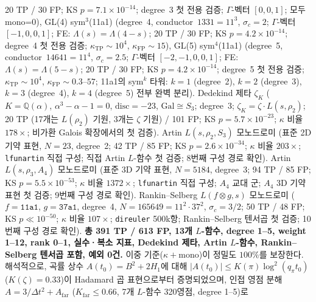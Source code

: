 \documentclass[11pt, a4paper]{article}
\theoremstyle{definition}
\theoremstyle{plain}
\begin{document}
\begin{itemize}
        20 TP / 30 FP; KS $p = 7.1 \times 10^{-14}$; degree~3 첫 전용 검증;
        $\Gamma$-벡터 $[0,0,1]$; 모두 mono=0),
        GL(4) sym$^3$(11a1) (degree~4, conductor~$1331=11^3$, $\sigma_c=2$;
        $\Gamma$-벡터 $[-1,0,0,1]$; FE: $\Lambda(s)=\Lambda(4-s)$;
        20 TP / 30 FP; KS $p = 4.2 \times 10^{-14}$; degree~4 첫 전용 검증;
        $\kappa_{\mathrm{TP}} \sim 10^4$, $\kappa_{\mathrm{FP}} \sim 15$),
        GL(5) sym$^4$(11a1) (degree~5, conductor~$14641=11^4$, $\sigma_c=2.5$;
        $\Gamma$-벡터 $[-2,-1,0,0,1]$; FE: $\Lambda(s)=\Lambda(5-s)$;
        20 TP / 30 FP; KS $p = 4.2 \times 10^{-14}$; degree~5 첫 전용 검증;
        $\kappa_{\mathrm{TP}} \sim 10^4$, $\kappa_{\mathrm{FP}} \sim 0.3$--$57$;
        11a1의 sym$^k$ 타워: $k=1$ (degree~2), $k=2$ (degree~3), $k=3$ (degree~4), $k=4$ (degree~5) 전부 완벽 분리).
        Dedekind 제타 $\zeta_K$ ($K = \mathbb{Q}(\alpha)$, $\alpha^3-\alpha-1=0$,
        $\mathrm{disc}=-23$, $\mathrm{Gal} \cong S_3$; degree~3;
        $\zeta_K = \zeta \cdot L(s,\rho_2)$;
        20 TP (17개는 $L(\rho_2)$ 기원, 3개는 $\zeta$ 기원) / 101 FP;
        KS $p = 5.7 \times 10^{-23}$; $\kappa$ 비율 $178\times$;
        비가환 Galois 확장에서의 첫 검증).
        Artin $L(s,\rho_2, S_3)$ 모노드로미 (표준 2D 기약 표현, $N=23$, degree~2;
        42 TP / 85 FP; KS $p = 2.6 \times 10^{-34}$; $\kappa$ 비율 $203\times$;
        \texttt{lfunartin} 직접 구성; 직접 Artin $L$-함수 첫 검증;
        8번째 구성 경로 확인).
        Artin $L(s,\rho_3, A_4)$ 모노드로미 (표준 3D 기약 표현, $N=5184$, degree~3;
        94 TP / 85 FP; KS $p = 5.5 \times 10^{-53}$; $\kappa$ 비율 $1372\times$;
        \texttt{lfunartin} 직접 구성; $A_4$ 교대 군; $A_4$ 3D 기약 표현 첫 검증;
        9번째 구성 경로 확인).
        Rankin--Selberg $L(f \otimes g, s)$ 모노드로미 ($f = \texttt{11a1}$, $g = \texttt{37a1}$,
        degree~4, $N = 165649 = 11^2 \cdot 37^2$, $\sigma_c = 3/2$;
        50 TP / 48 FP; KS $p \ll 10^{-50}$; $\kappa$ 비율 $107\times$;
        \texttt{direuler} 500k항; Rankin--Selberg 텐서곱 첫 검증;
        10번째 구성 경로 확인).
        \textbf{총 391 TP / 613 FP, 13개 $L$-함수, degree 1--5, weight 1--12, rank 0--1, 실수·복소 지표, Dedekind 제타, Artin $L$-함수, Rankin--Selberg 텐서곱 포함, 예외 0건.}
        이중 기준($\kappa + \mathrm{mono}$)이 정밀도 $100\%$를 보장한다.
        해석적으로, 곡률 상수 $A(t_0) = B^2 + 2H_1$에 대해
        $|A(t_0)| \leq K(\pi)\log^2(q_\pi t_0)$ ($K(\zeta)=0.33$)이
        Hadamard 곱 표현으로부터 증명되었으며,
        인접 영점 분해 $A = 3/\Delta t^2 + A_{\mathrm{far}}$
        ($K_{\mathrm{far}} \leq 0.66$, 7개 $L$-함수 320영점, degree 1--5)로

\end{itemize}
\end{document}
